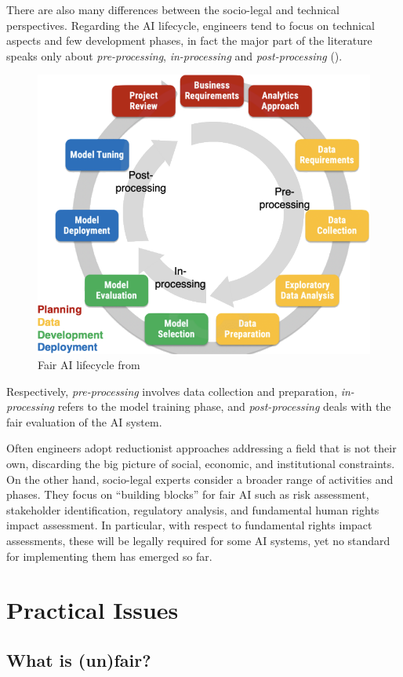 \documentclass[12pt,a4paper,openright,twoside]{book}
\begin{document}
There are also many differences between the socio-legal and technical perspectives.
%
Regarding the \ac{AI} lifecycle, engineers tend to focus on technical aspects and few development phases, in fact the major part of the literature speaks only about \textit{pre-processing}, \textit{in-processing} and \textit{post-processing} ().
%
\begin{figure}
    \centering
    \includegraphics[width=.6\linewidth]{figures/ai-lifecycle.png}
    \caption{Fair \acs{AI} lifecycle from~\cite{DBLP:conf/ijcai/CalegariCMO23}}
    \label{fig:ai-lifecycle}
\end{figure}
%
Respectively, \textit{pre-processing} involves data collection and preparation, \textit{in-processing} refers to the model training phase, and \textit{post-processing} deals with the fair evaluation of the \ac{AI} system.

Often engineers adopt reductionist approaches addressing a field that is not their own, discarding the big picture of social, economic, and institutional constraints.
%
On the other hand, socio-legal experts consider a broader range of activities and phases.
%
They focus on ``building blocks'' for fair \ac{AI} such as risk assessment, stakeholder identification, regulatory analysis, and fundamental human rights impact assessment.
%
In particular, with respect to fundamental rights impact assessments, these will be legally required for some \ac{AI} systems, yet no standard for implementing them has emerged so far.




\section{Practical Issues}

\subsection{What is (un)fair?}
\end{document}
